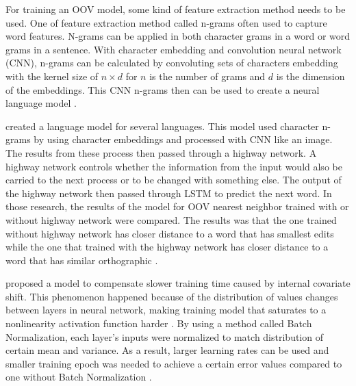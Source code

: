 For training an OOV model, some kind of feature extraction method
needs to be used. One of feature extraction method called n-grams
often used to capture word features. N-grams can be applied in both
character grams in a word or word grams in a sentence. With character
embedding and convolution neural network (CNN), n-grams can be
calculated by convoluting sets of characters embedding with the kernel
size of $n \times d$ for $n$ is the number of grams and $d$ is the
dimension of the embeddings. This CNN n-grams then can be used to
create a neural language model \citep{character2015kim}.

\cite{character2015kim} created a language model for several
languages. This model used character n-grams by using character
embeddings and processed with CNN like an image. The results from
these process then passed through a highway network. A highway network
controls whether the information from the input would also be carried
to the next process or to be changed with something else. The output
of the highway network then passed through LSTM to predict the next
word. In those research, the results of the model for OOV nearest
neighbor trained with or without highway network were compared. The
results was that the one trained without highway network has closer
distance to a word that has smallest edits while the one that trained
with the highway network has closer distance to a word that has
similar orthographic \citep{character2015kim}.

\cite{batchnorm:DBLP:journals/corr/IoffeS15} proposed a model to
compensate slower training time caused by internal covariate shift.
This phenomenon happened because of the distribution of values changes
between layers in neural network, making training model that saturates
to a nonlinearity activation function harder
\citep{batchnorm:DBLP:journals/corr/IoffeS15}. By using a method
called Batch Normalization, each layer's inputs were normalized to
match distribution of certain mean and variance. As a result, larger
learning rates can be used and smaller training epoch was needed to
achieve a certain error values compared to one without Batch
Normalization \citep{batchnorm:DBLP:journals/corr/IoffeS15}.